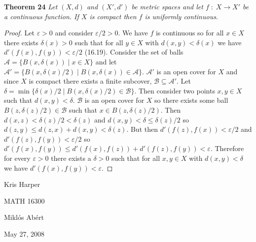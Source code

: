 \documentclass{article}
\begin{document}
\begin{flushleft}
\textbf{Theorem 24}
\textsl{Let $(X,d)$ and $(X',d')$ be metric spaces and let $f \; : \; X \rightarrow X'$ be a continuous function. If $X$ is compact then $f$ is uniformly continuous.}
\begin{proof}
Let $\varepsilon > 0$ and consider $\varepsilon/2 > 0$. We have $f$ is continuous so for all $x \in X$ there exists $\delta (x) > 0$ such that for all $y \in X$ with $d(x,y) < \delta (x)$ we have $d'(f(x),f(y)) < \varepsilon/2$ (16.19). Consider the set of balls $\mathcal{A} = \{B(x, \delta (x)) \mid x\in X\}$ and let $\mathcal{A}' = \{B(x, \delta(x)/2) \mid B(x, \delta(x)) \in \mathcal{A}\}$. $\mathcal{A}'$ is an open cover for $X$ and since $X$ is compact there exists a finite subcover, $\mathcal{B} \subseteq \mathcal{A}'$. Let $\delta = \min \{\delta(x)/2 \mid B(x, \delta(x)/2) \in \mathcal{B} \}$. Then consider two points $x,y \in X$ such that $d(x,y) < \delta$. $\mathcal{B}$ is an open cover for $X$ so there exists some ball $B(z, \delta(z)/2) \in \mathcal{B}$ such that $x \in B(z, \delta(z)/2)$. Then $d(x,z) < \delta(z)/2 < \delta(z)$ and $d(x,y) < \delta \leq \delta(z)/2$ so $d(z,y) \leq d(z,x) + d(x,y) < \delta(z)$. But then $d'(f(z),f(x)) < \varepsilon/2$ and $d'(f(z),f(y)) < \varepsilon/2$ so $d'(f(x),f(y)) \leq d'(f(x),f(z)) + d'(f(z),f(y)) < \varepsilon$. Therefore for every $\varepsilon > 0$ there exists a $\delta > 0$ such that for all $x,y \in X$ with $d(x,y) < \delta$ we have $d'(f(x),f(y)) < \varepsilon$.
\end{proof}

\end{flushleft}

\newpage

\begin{flushright}
Kris Harper

MATH 16300

Mikl\'{o}s Ab\'{e}rt

May 27, 2008
\end{flushright}
\end{document}
